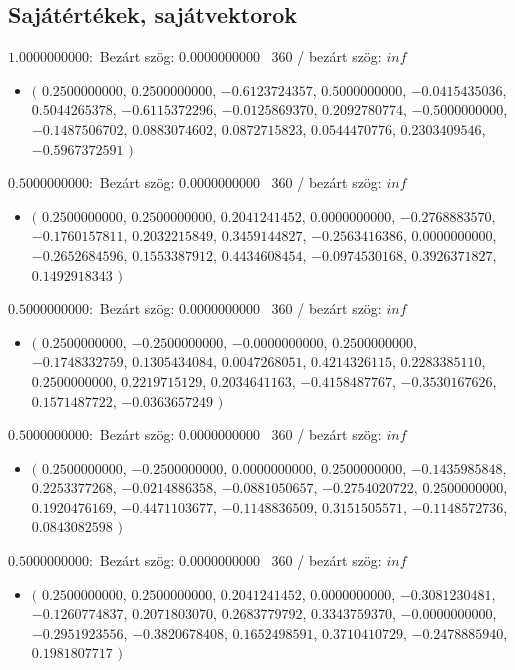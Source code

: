 \documentclass[14pt,a4paper]{article}
\begin{document}
\subsection{Sajátértékek, sajátvektorok}
$1.0000000000$:\
Bezárt szög: $0.0000000000$ \
360 / bezárt szög: $inf$\
\begin{itemize}
\item
$\big($
$0.2500000000$, $0.2500000000$, $-0.6123724357$, $0.5000000000$, $-0.0415435036$, $0.5044265378$, $-0.6115372296$, $-0.0125869370$, $0.2092780774$, $-0.5000000000$, $-0.1487506702$, $0.0883074602$, $0.0872715823$, $0.0544470776$, $0.2303409546$, $-0.5967372591$
$\big)$
\end{itemize}
$0.5000000000$:\
Bezárt szög: $0.0000000000$ \
360 / bezárt szög: $inf$\
\begin{itemize}
\item
$\big($
$0.2500000000$, $0.2500000000$, $0.2041241452$, $0.0000000000$, $-0.2768883570$, $-0.1760157811$, $0.2032215849$, $0.3459144827$, $-0.2563416386$, $0.0000000000$, $-0.2652684596$, $0.1553387912$, $0.4434608454$, $-0.0974530168$, $0.3926371827$, $0.1492918343$
$\big)$
\end{itemize}
$0.5000000000$:\
Bezárt szög: $0.0000000000$ \
360 / bezárt szög: $inf$\
\begin{itemize}
\item
$\big($
$0.2500000000$, $-0.2500000000$, $-0.0000000000$, $0.2500000000$, $-0.1748332759$, $0.1305434084$, $0.0047268051$, $0.4214326115$, $0.2283385110$, $0.2500000000$, $0.2219715129$, $0.2034641163$, $-0.4158487767$, $-0.3530167626$, $0.1571487722$, $-0.0363657249$
$\big)$
\end{itemize}
$0.5000000000$:\
Bezárt szög: $0.0000000000$ \
360 / bezárt szög: $inf$\
\begin{itemize}
\item
$\big($
$0.2500000000$, $-0.2500000000$, $0.0000000000$, $0.2500000000$, $-0.1435985848$, $0.2253377268$, $-0.0214886358$, $-0.0881050657$, $-0.2754020722$, $0.2500000000$, $0.1920476169$, $-0.4471103677$, $-0.1148836509$, $0.3151505571$, $-0.1148572736$, $0.0843082598$
$\big)$
\end{itemize}
$0.5000000000$:\
Bezárt szög: $0.0000000000$ \
360 / bezárt szög: $inf$\
\begin{itemize}
\item
$\big($
$0.2500000000$, $0.2500000000$, $0.2041241452$, $0.0000000000$, $-0.3081230481$, $-0.1260774837$, $0.2071803070$, $0.2683779792$, $0.3343759370$, $-0.0000000000$, $-0.2951923556$, $-0.3820678408$, $0.1652498591$, $0.3710410729$, $-0.2478885940$, $0.1981807717$
$\big)$
\end{itemize}
\end{document}
